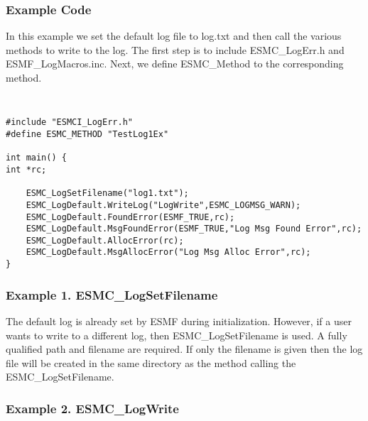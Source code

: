 %


\subsubsection{Example Code}

In this example we set the default log file to log.txt and then call the 
various methods to write to the log.  The first step is to include 
ESMC\_LogErr.h and ESMF\_LogMacros.inc.  Next, we define ESMC\_Method to 
the corresponding method.

{\tt
\begin{verbatim}
#include "ESMCI_LogErr.h"
#define ESMC_METHOD "TestLog1Ex"

int main() {
int *rc;
    
    ESMC_LogSetFilename("log1.txt");
    ESMC_LogDefault.WriteLog("LogWrite",ESMC_LOGMSG_WARN);
    ESMC_LogDefault.FoundError(ESMF_TRUE,rc);
	ESMC_LogDefault.MsgFoundError(ESMF_TRUE,"Log Msg Found Error",rc);
    ESMC_LogDefault.AllocError(rc);
	ESMC_LogDefault.MsgAllocError("Log Msg Alloc Error",rc);
}
\end{verbatim}
\tt}

\subsubsection{Example 1. ESMC\_LogSetFilename}

The default log is already set by ESMF during initialization.  However, if a user
wants to write to a different log, then ESMC\_LogSetFilename is used.  A fully 
qualified path and filename are required.  If only the filename is given then
the log file will be created in the same directory as the method calling the
ESMC\_LogSetFilename.

\subsubsection{Example 2. ESMC\_LogWrite}

